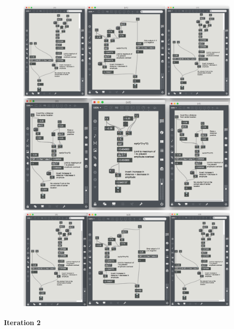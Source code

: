 \documentclass[../../main.tex]{subfiles}
\begin{document}
			\begin{figure}[H]
				\centerline{\includegraphics[scale = 0.4]{Sections/Implementation/Max/images/Max/iteration1/panning1.png}}
				\centerline{\includegraphics[scale = 0.4]{Sections/Implementation/Max/images/Max/iteration1/panning2.png}}
				\centerline{\includegraphics[scale = 0.4]{Sections/Implementation/Max/images/Max/iteration1/panning3.png}}
				\caption{}
				\label{iteration1PanningCombined}
			\end{figure}


		 \paragraph{Iteration 2}
\end{document}
